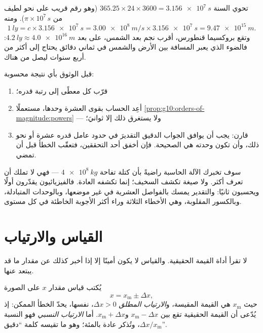 \begin{example}\label{ex:g10:orders-of-magnitude:ly}
تحوي السنة $365.25 \times 24 \times 3600 = \qty{3.156e7}{s}$
(وهو رقم قريب على نحو لطيف من $\pi \times 10^{7}\,\unit{s}$). ومنه
\[
\qty{1}{ly} = c \times \qty{3.156e7}{s}
= \qty{3.00e8}{m/s} \times \qty{3.156e7}{s}
= \qty{9.47e15}{m}.
\]
وتقع بروكسيما قنطورس، أقرب نجم بعد الشمس، على بعد
$\qty{4.2}{ly} \approx \qty{4.0e16}{m}$: فالضوء الذي يعبر
المسافة بين الأرض والشمس في ثماني دقائق يحتاج إلى أكثر من أربع سنوات ليصل
من هناك.
\end{example}

\begin{method}\label{met:g10:orders-of-magnitude:sanity}
قبل الوثوق بأي نتيجة محسوبة:
\begin{enumerate}
  \item قرّب كل معطًى إلى رتبة قدره؛
  \item أعِد الحساب بقوى العشرة وحدها، مستعملًا
        \cref{prop:g10:orders-of-magnitude:powers} --- ولا يستغرق ذلك
        إلا ثوانيَ؛
  \item قارن: يجب أن يوافق الجواب الدقيق التقديرَ
        في حدود عامل قدره عشرة أو نحو ذلك، وأن تكون وحدته هي
        الصحيحة. فإن أخفق أحد التحققين، فتعقّب الخطأ قبل أن
        تمضي.
\end{enumerate}
\end{method}

\begin{remark}\label{rem:g10:orders-of-magnitude:sanity}
سوف تخبرك الآلة الحاسبة راضيةً بأن كتلة تفاحة
$\qty{4e8}{kg}$ --- فهي لا تملك أن تعرف أكثر. ولا صيغة تكشف
السخيف؛ إنما تكشفه العادة. فالفيزيائيون يقدّرون أولًا ويحسبون ثانيًا:
والتقدير يمسك بالفواصل العشرية في غير موضعها، وبالوحدات المتبادلة،
وبالكسور المقلوبة، وهي الأخطاء الثلاثة وراء أكثر الأجوبة الخاطئة في
كل مستوى.
\end{remark}

\section{القياس والارتياب}

لا تقرأ أداة القيمة الحقيقية. والقياس لا يكون أمينًا إلا إذا
أخبر كذلك عن مقدار ما قد يبتعد عنها.

\begin{definition}\label{def:g10:orders-of-magnitude:uncertainty}
يُكتب قياس مقدار $x$ على الصورة
\[
x = x_{\text{m}} \pm \Delta x ,
\]
حيث $x_{\text{m}}$ هي القيمة المقيسة، و\emph{الارتياب
المطلق} $\Delta x > 0$، 
نفسها، يحدّ الخطأ الممكن: إذ يُدّعى أن القيمة الحقيقية تقع
بين $x_{\text{m}} - \Delta x$ و$x_{\text{m}} + \Delta x$. أما
\emph{الارتياب النسبي} فهو النسبة
$\Delta x / x_{\text{m}}$، وتُذكر عادة بالمئة؛ وهو ما تقيسه
كلمة ``دقيق''.
\end{definition}

